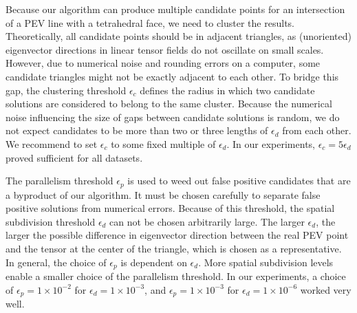 %
Because our algorithm can produce multiple candidate points for an intersection
of a \ac{PEV} line with a tetrahedral face, we need to cluster the results.
%
Theoretically, all candidate points should be in adjacent triangles, as
(unoriented) eigenvector directions in linear tensor fields do not oscillate
on small scales.
%
However, due to numerical noise and rounding errors on a computer, some
candidate triangles might not be exactly adjacent to each other.
%
To bridge this gap, the clustering threshold $\epsilon_c$ defines the radius in
which two candidate solutions are considered to belong to the same cluster.
%
Because the numerical noise influencing the size of gaps between candidate
solutions is random, we do not expect candidates to be more than two or three
lengths of $\epsilon_d$ from each other.
%
We recommend to set $\epsilon_c$ to some fixed multiple of $\epsilon_d$.
%
In our experiments, $\epsilon_c = 5 \epsilon_d$ proved sufficient for all
datasets.
%

%
The parallelism threshold $\epsilon_p$ is used to weed out false positive
candidates that are a byproduct of our algorithm.
%
It must be chosen carefully to separate false positive solutions from numerical
errors.
%
Because of this threshold, the spatial subdivision threshold $\epsilon_d$ can
not be chosen arbitrarily large.
%
The larger $\epsilon_d$, the larger the possible difference in eigenvector
direction between the real \ac{PEV} point and the tensor at the center of the
triangle, which is chosen as a representative.
%
In general, the choice of $\epsilon_p$ is dependent on $\epsilon_d$.
%
More spatial subdivision levels enable a smaller choice of the parallelism
threshold.
%
In our experiments, a choice of $\epsilon_p = 1 \times 10^{-2}$ for
$\epsilon_d = 1 \times 10^{-3}$, and $\epsilon_p = 1 \times 10^{-3}$ for
$\epsilon_d = 1 \times 10^{-6}$ worked very well.
%